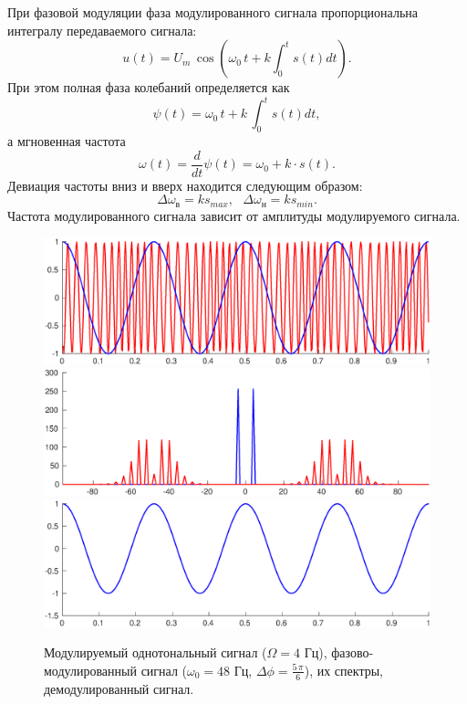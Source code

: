 \documentclass[a4paper,14pt]{extarticle}
\begin{document}
При фазовой модуляции фаза модулированного сигнала пропорциональна интегралу передаваемого сигнала:
\begin{equation*}
u(t) = U_m \, \cos(\omega_0 \, t + k \int_0^t s(t) dt).
\end{equation*}
При этом полная фаза колебаний определяется как
\begin{equation*}
\psi(t) = \omega_0 \, t + k \, \int_0^t s(t) dt,
\end{equation*}
а мгновенная частота
\begin{equation*}
\omega(t) = \frac{d}{dt} \psi(t) =  \omega_0 + k \cdot s(t).
\end{equation*}
Девиация частоты вниз и вверх находится следующим образом:
\begin{equation*}
\Delta \omega_\text{в} = k s_{max}, ~ ~ ~ \Delta \omega_\text{н} = k s_{min}.
\end{equation*} 
Частота модулированного сигнала зависит от амплитуды модулируемого сигнала.

\begin{figure}[p]
\centering
\includegraphics[width=1\textwidth]{pmod.eps}
\includegraphics[width=1\textwidth]{pmod_s.eps}
\includegraphics[width=1\textwidth]{pdemod.eps}
\captionsetup{justification=centering,margin=0.5cm}
\caption{Модулируемый однотональный сигнал ($\Omega = 4$ Гц), фазово-модулированный сигнал ($\omega_0 = 48$ Гц, $\Delta \phi = \frac{5\,\pi}{6}$), их спектры, демодулированный сигнал.}
\label{pm}
\end{figure}
\end{document}
